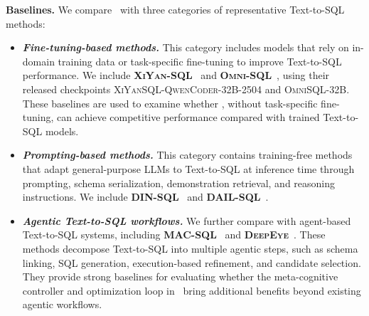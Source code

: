 
\textbf{Baselines.}
We compare \toolname\ with three categories of representative Text-to-SQL methods:

\begin{itemize}[leftmargin=10pt]
\item \textbf{\textit{Fine-tuning-based methods.}}
This category includes models that rely on in-domain training data or task-specific fine-tuning to improve Text-to-SQL performance.
We include \textbf{\textsc{XiYan-SQL}}~\cite{liu2025xiyansql} and \textbf{\textsc{Omni-SQL}}~\cite{li2025omnisql}, using their released checkpoints \textsc{XiYanSQL-QwenCoder-32B-2504} and \textsc{OmniSQL-32B}.
These baselines are used to examine whether \toolname, without task-specific fine-tuning, can achieve competitive performance compared with trained Text-to-SQL models.

\item \textbf{\textit{Prompting-based methods.}}
This category contains training-free methods that adapt general-purpose LLMs to Text-to-SQL at inference time through prompting, schema serialization, demonstration retrieval, and reasoning instructions.
We include \textbf{\textsc{DIN-SQL}}~\cite{pourreza2023din} and \textbf{\textsc{DAIL-SQL}}~\cite{gao2023text}.

\item \textbf{\textit{Agentic Text-to-SQL workflows.}}
We further compare with agent-based Text-to-SQL systems, including \textbf{\textsc{MAC-SQL}}~\cite{wang2023mac} and \textbf{\textsc{DeepEye}}~\cite{li2026deepeye}.
These methods decompose Text-to-SQL into multiple agentic steps, such as schema linking, SQL generation, execution-based refinement, and candidate selection.
They provide strong baselines for evaluating whether the meta-cognitive controller and optimization loop in \toolname\ bring additional benefits beyond existing agentic workflows.
\end{itemize}

